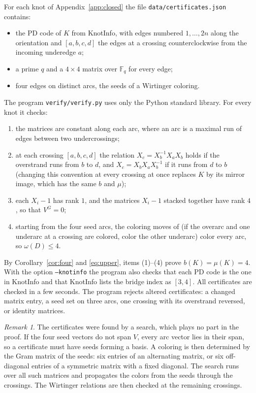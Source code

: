 \documentclass[11pt]{amsart}
\theoremstyle{definition}
\theoremstyle{remark}
\newtheorem{remark}[theorem]{Remark}
\newcommand{\F}{\mathbb{F}}
\begin{document}
For each knot of Appendix~\ref{app:closed} the file \texttt{data/certificates.json}
contains:
\begin{itemize}
\item the PD code of $K$ from KnotInfo, with edges numbered $1,\dots,2n$ along the
orientation and $[a,b,c,d]$ the edges at a crossing counterclockwise from the incoming
underedge $a$;
\item a prime $q$ and a $4\times4$ matrix over $\F_q$ for every edge;
\item four edges on distinct arcs, the seeds of a Wirtinger coloring.
\end{itemize}
The program \texttt{verify/verify.py} uses only the Python standard library. For every
knot it checks:
\begin{enumerate}
\item the matrices are constant along each arc, where an arc is a maximal run of edges
between two undercrossings;
\item at each crossing $[a,b,c,d]$ the relation $X_c=X_b^{-1}X_aX_b$ holds if the
overstrand runs from $b$ to $d$, and $X_c=X_bX_aX_b^{-1}$ if it runs from $d$ to $b$
(changing this convention at every crossing at once replaces $K$ by its mirror image, which
has the same $b$ and $\mu$);
\item each $X_i-1$ has rank $1$, and the matrices $X_i-1$ stacked together have rank $4$,
so that $V^G=0$;
\item starting from the four seed arcs, the coloring moves of \cite{BKVV} (if the overarc
and one underarc at a crossing are colored, color the other underarc) color every arc, so
$\omega(D)\le4$.
\end{enumerate}
By Corollary~\ref{cor:four} and \eqref{eq:upper}, items (1)--(4) prove $b(K)=\mu(K)=4$.
With the option \texttt{--knotinfo} the program also checks that each PD code is the one
in KnotInfo and that KnotInfo lists the bridge index as $[3,4]$. All \nclosed{}
certificates are checked in a few seconds. The program rejects altered
certificates: a changed matrix entry, a seed set on three arcs, one crossing with its
overstrand reversed, or identity matrices.

\begin{remark}
The certificates were found by a search, which plays no part in the proof. If the four
seed vectors do not span $V$, every arc vector lies in their span, so a certificate must
have seeds forming a basis. A coloring is then determined by the Gram matrix of the seeds:
six entries of an alternating matrix, or six off-diagonal entries of a symmetric matrix
with a fixed diagonal. The search runs over all such matrices and propagates the colors
from the seeds through the crossings. The Wirtinger relations are then checked at the
remaining crossings.
\end{remark}
\end{document}
